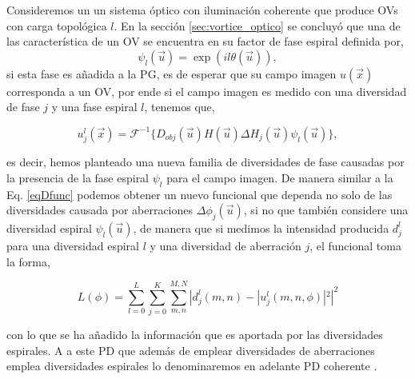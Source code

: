 Consideremos un un sistema óptico con iluminación coherente que produce OVs con carga topológica $l$. En la sección \ref{sec:vortice_optico} se concluyó que una de las característica de un OV se encuentra en su factor de fase espiral definida por,
\begin{equation}
	\psi_l (\vec{u}) = \exp(il \theta (\vec{u})),
\end{equation} 
si esta fase es añadida a la PG, es de esperar que su campo imagen $u(\vec{x})$ corresponda a un OV, por ende si el campo imagen es medido con una diversidad de fase $j$ y una fase espiral $l$, tenemos que,

\begin{equation}
\label{eqD27}
	u_{j}^l (\vec{x}) = \mathscr{F}^{-1} \{D_{obj}(\vec{u}) H(\vec{u}) \Delta H_j(\vec{u}) \psi_l (\vec{u})\},
\end{equation}

es decir, hemos planteado una nueva familia de diversidades de fase causadas por la presencia de la fase espiral $\psi_l$ para el campo imagen. De manera similar a la Eq. \ref{eqDfunc} podemos obtener un nuevo funcional que dependa no solo de las diversidades causada por aberraciones $\Delta \phi_j (\vec{u})$, si no que también considere una diversidad espiral $\psi _l (\vec{u})$, de manera que si medimos la intensidad producida $d_j^{l}$ para una diversidad espiral $l$ y una diversidad de aberración $j$, el funcional toma la forma,

\begin{equation}
\label{eqDfuncCohere}
L (\phi) = \sum\limits_{l=0}^{L} \sum\limits_{j=0}^{K} \sum\limits_{m,n}^{M,N} |d_j^l(m,n) - |u_j^l(m,n,\phi)|^2|^2
\end{equation}

con lo que se ha añadido la información que es aportada por las diversidades espirales. A a este PD que además de emplear diversidades de aberraciones emplea diversidades espirales lo denominaremos en adelante PD coherente \cite{Echeverri2015}. \\

